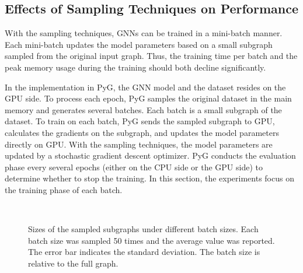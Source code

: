 \subsection{Effects of Sampling Techniques on Performance}
\label{sec:effects_of_sampling_techniques_on_performance}

With the sampling techniques, GNNs can be trained in a mini-batch manner.
Each mini-batch updates the model parameters based on a small subgraph sampled from the original input graph.
Thus, the training time per batch and the peak memory usage during the training should both decline significantly.

In the implementation in PyG, the GNN model and the dataset resides on the GPU side.
To process each epoch, PyG samples the original dataset in the main memory and generates several batches.
Each batch is a small subgraph of the dataset.
To train on each batch, PyG sends the sampled subgraph to GPU, calculates the gradients on the subgraph, and updates the model parameters directly on GPU.
With the sampling techniques, the model parameters are updated by a stochastic gradient descent optimizer.
PyG conducts the evaluation phase every several epochs (either on the CPU side or the GPU side) to determine whether to stop the training.
In this section, the experiments focus on the training phase of each batch.

\begin{figure}
    \centering
     \\
    \caption{Sizes of the sampled subgraphs under different batch sizes. Each batch size was sampled 50 times and the average value was reported. The error bar indicates the standard deviation. The batch size is relative to the full graph.}
    \label{fig:exp_sampling_minibatch_graph_info}
\end{figure}

